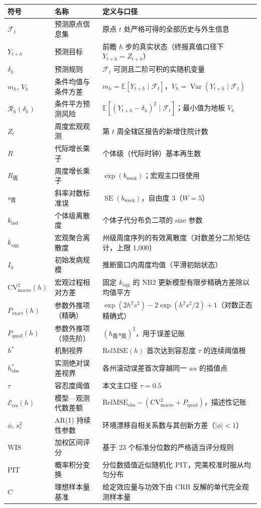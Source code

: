 \begin{tabular}{@{}>{\raggedright\arraybackslash}p{2.6cm}>{\raggedright\arraybackslash}p{3.2cm}>{\raggedright\arraybackslash}p{9.0cm}@{}}
\toprule
符号 & 名称 & 定义与口径 \\
\midrule
$\mathcal{F}_t$ & 预测原点信息集 & 原点 $t$ 处严格可得的全部历史与外生信息 \\
$Y_{t+h}$ & 预测目标 & 前瞻 $h$ 步的真实状态（终报真值口径下 $Y_{t+h}=Z_{t+h}$） \\
$\delta_h$ & 预测规则 & $\mathcal{F}_t$ 可测且二阶可积的实随机变量 \\
$m_h,\,V_h$ & 条件均值与条件方差 & $m_h=\mathbb{E}[Y_{t+h}\mid\mathcal{F}_t]$，$V_h=\operatorname{Var}(Y_{t+h}\mid\mathcal{F}_t)$ \\
$\mathcal{R}_h(\delta_h)$ & 条件平方预测风险 & $\mathbb{E}[(Y_{t+h}-\delta_h)^2\mid\mathcal{F}_t]$；最小值为地板 $V_h$ \\
$Z_t$ & 周度宏观观测 & 第 $t$ 周全辖区报告的新增住院计数 \\
$R$ & 代际增长乘子 & 个体级（代际时钟）基本再生数 \\
$R_{\text{周}}$ & 周度增长乘子 & $\exp(b_{\text{week}})$；宏观主口径使用 \\
$s_{\text{周}}$ & 斜率对数标准误 & $\operatorname{SE}(b_{\text{week}})$，自由度 $3$（$W=5$） \\
$k_{\text{ind}}$ & 个体级离散度 & 个体子代分布负二项的 size 参数 \\
$k_{\text{agg}}$ & 宏观聚合离散度 & 州级周度序列的有效离散度（对数差分二阶矩估计，上限 1,000） \\
$I_0$ & 初始发病规模 & 推断窗口内周度均值（平滑初始状态） \\
$\text{CV}^2_{\text{macro}}(h)$ & 宏观过程相对方差 & 固定 $k_{\text{agg}}$ 的 NB2 更新模型有限步精确方差除以均值平方 \\
$P_{\text{exact}}(h)$ & 参数外推项（精确） & $\exp(2h^2s^2)-2\exp(h^2s^2/2)+1$（对数正态精确式） \\
$P_{\text{quad}}(h)$ & 参数外推项（领先阶） & $(h_{\text{周}}s_{\text{周}})^2$，用于误差记账 \\
$h^*$ & 机制视界 & $\text{RelMSE}(h)$ 首次达到容忍度 $\tau$ 的连续阈值根 \\
$h^*_{\text{obs}}$ & 实测绝对误差视界 & 各州滚动误差首次穿越同一 $	au$ 的插值点 \\
$\tau$ & 容忍度阈值 & 本文主口径 $\tau=0.5$ \\
$\mathcal{E}_{\text{res}}(h)$ & 模型—观测代数差额 & $\text{RelMSE}_{\text{obs}}-(\text{CV}^2_{\text{macro}}+P_{\text{quad}})$，描述性记账 \\
$\phi,\,s_e^2$ & AR(1) 持续性参数 & 环境漂移自相关系数与其创新方差（$|\phi|<1$） \\
$\text{WIS}$ & 加权区间评分 & 基于 23 个标准分位数的严格适当评分规则 \\
$\text{PIT}$ & 概率积分变换 & 分位数插值近似随机化 PIT，完美校准时服从均匀分布 \\
$C$ & 理想样本量基准 & 给定效应量与功效下由 CRB 反解的单代完全观测样本量 \\
\bottomrule
\end{tabular}
